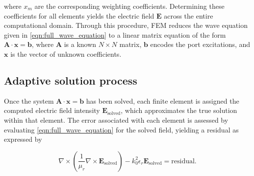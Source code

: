 where $x_m$ are the corresponding weighting coefficients. Determining these coefficients for all elements yields the electric field $\mathbf{E}$ across the entire computational domain. Through this procedure, FEM reduces the wave equation given in \eqref{eqn:full_wave_equation} to a linear matrix equation of the form $\mathbf{A}\cdot\mathbf{x}=\mathbf{b}$, where $\mathbf{A}$ is a known $N\times N$ matrix, $\mathbf{b}$ encodes the port excitations, and $\mathbf{x}$ is the vector of unknown coefficients. 
%


\subsection{Adaptive solution process}\label{sec:adap_sol_pro}

Once the system $\mathbf{A}\cdot\mathbf{x}=\mathbf{b}$ has been solved, 
each finite element is assigned the computed electric field intensity 
$\mathbf{E}_{\mathrm{solved}}$, which approximates the true solution 
within that element. The error associated with each element is assessed by evaluating \eqref{eqn:full_wave_equation} for the solved field, yielding a residual as expressed by \cite{kopp_hfss}

\begin{equation}
	\nabla\times\left(\frac{1}{\mu_r}\nabla\times\mathbf{E}_{\mathrm{solved}}\right)-k_0^2\epsilon_r\mathbf{E}_{\mathrm{solved}}=\text{residual}.
	\label{eqn:full_wave_equation_solved}
\end{equation}

